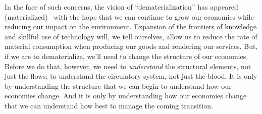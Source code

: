 In the face of such concerns,
the vision of ``dematerialization'' 
has appeared (materialized)~\cite{Bernardini1993, Wernick1996, Cleveland1998}
with the hope that we can continue to grow our economies
while reducing our impact on the environment.
Expansion of the frontiers of knowledge and skillful use of technology will,
we tell ourselves, 
allow us to reduce the rate of material consumption 
when producing our goods and rendering our services.
But, if we are to dematerialize, 
we'll need to change the structure of our economies.
Before we do that, however, we need to \emph{understand}
the structural elements,
not just the flows;
to understand the circulatory system,
not just the blood.
It is only by understanding the structure that we can 
begin to understand how our economies change.
And it is only by understanding how our economies change
that we can understand how best to manage the coming
transition.



